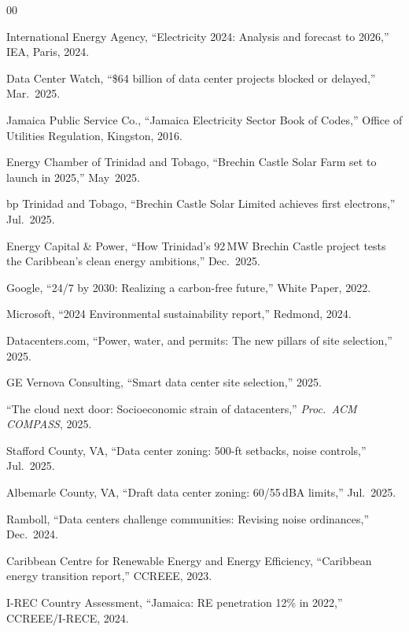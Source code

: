 \documentclass[conference,10pt]{IEEEtran}
\begin{document}
\begin{thebibliography}{00}

 International Energy Agency, ``Electricity 2024: Analysis and forecast to 2026,'' IEA, Paris, 2024.

 Data Center Watch, ``\$64 billion of data center projects blocked or delayed,'' Mar.~2025.

 Jamaica Public Service Co., ``Jamaica Electricity Sector Book of Codes,'' Office of Utilities Regulation, Kingston, 2016.

 Energy Chamber of Trinidad and Tobago, ``Brechin Castle Solar Farm set to launch in 2025,'' May~2025.

 bp Trinidad and Tobago, ``Brechin Castle Solar Limited achieves first electrons,'' Jul.~2025.

 Energy Capital \& Power, ``How Trinidad's 92\,MW Brechin Castle project tests the Caribbean's clean energy ambitions,'' Dec.~2025.

 Google, ``24/7 by 2030: Realizing a carbon-free future,'' White Paper, 2022.

 Microsoft, ``2024 Environmental sustainability report,'' Redmond, 2024.

 Datacenters.com, ``Power, water, and permits: The new pillars of site selection,'' 2025.

 GE Vernova Consulting, ``Smart data center site selection,'' 2025.

 ``The cloud next door: Socioeconomic strain of datacenters,'' \textit{Proc.~ACM COMPASS}, 2025.

 Stafford County, VA, ``Data center zoning: 500-ft setbacks, noise controls,'' Jul.~2025.

 Albemarle County, VA, ``Draft data center zoning: 60/55\,dBA limits,'' Jul.~2025.

 Ramboll, ``Data centers challenge communities: Revising noise ordinances,'' Dec.~2024.

 Caribbean Centre for Renewable Energy and Energy Efficiency, ``Caribbean energy transition report,'' CCREEE, 2023.

 I-REC Country Assessment, ``Jamaica: RE penetration 12\% in 2022,'' CCREEE/I-RECE, 2024.


\end{thebibliography}
\end{document}
